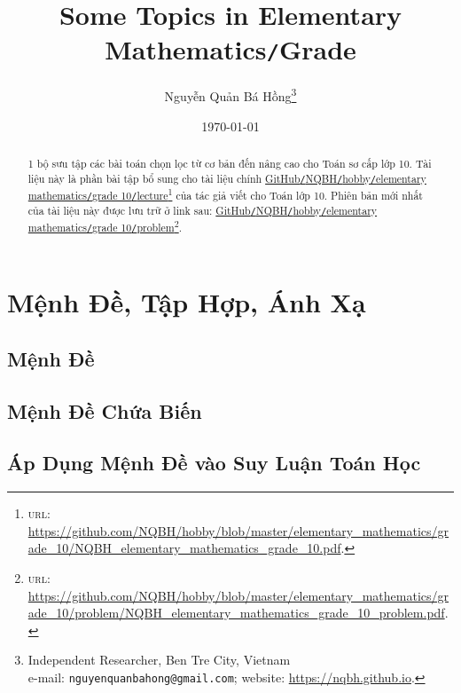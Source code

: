 \documentclass{article}
\title{Some Topics in Elementary Mathematics\texttt{/}Grade }
\author{Nguyễn Quản Bá Hồng\footnote{Independent Researcher, Ben Tre City, Vietnam\\e-mail: \texttt{nguyenquanbahong@gmail.com}; website: \url{https://nqbh.github.io}.}}
\date{\today}
\numberwithin{equation}{section}
\begin{document}
\maketitle
\begin{abstract}
	1 bộ sưu tập các bài toán chọn lọc từ cơ bản đến nâng cao cho Toán sơ cấp lớp 10. Tài liệu này là phần bài tập bổ sung cho tài liệu chính \href{https://github.com/NQBH/hobby/blob/master/elementary_mathematics/grade_10/NQBH_elementary_mathematics_grade_10.pdf}{GitHub\texttt{/}NQBH\texttt{/}hobby\texttt{/}elementary mathematics\texttt{/}grade 10\texttt{/}lecture}\footnote{\textsc{url}: \url{https://github.com/NQBH/hobby/blob/master/elementary_mathematics/grade_10/NQBH_elementary_mathematics_grade_10.pdf}.} của tác giả viết cho Toán lớp 10. Phiên bản mới nhất của tài liệu này được lưu trữ ở link sau: \href{https://github.com/NQBH/hobby/blob/master/elementary_mathematics/grade_10/problem/NQBH_elementary_mathematics_grade_10_problem.pdf}{GitHub\texttt{/}NQBH\texttt{/}hobby\texttt{/}elementary mathematics\texttt{/}grade 10\texttt{/}problem}\footnote{\textsc{url}: \url{https://github.com/NQBH/hobby/blob/master/elementary_mathematics/grade_10/problem/NQBH_elementary_mathematics_grade_10_problem.pdf}.}.
\end{abstract}
\tableofcontents
\newpage


\section{Mệnh Đề, Tập Hợp, Ánh Xạ}

\subsection{Mệnh Đề}


\subsection{Mệnh Đề Chứa Biến}


\subsection{Áp Dụng Mệnh Đề vào Suy Luận Toán Học}
\end{document}
